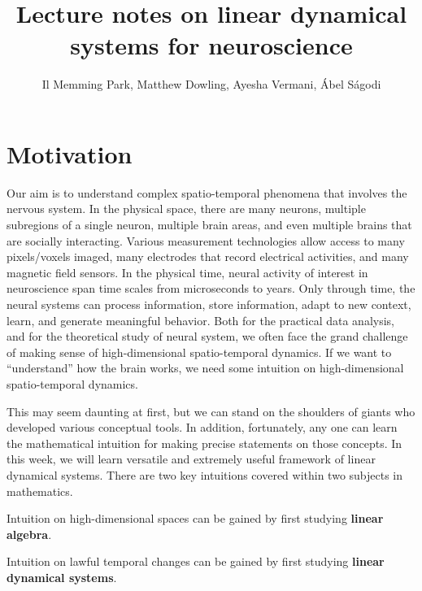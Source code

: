 \documentclass[a4paper,11pt]{exam}
\title{Lecture notes on linear dynamical systems for neuroscience}
\author{Il Memming Park, Matthew Dowling, Ayesha Vermani, \'Abel S\'agodi}
\newcounter{ct}
\begin{document}
\maketitle
\section{Motivation}
Our aim is to understand complex spatio-temporal phenomena that involves the nervous system.
In the physical space, there are many neurons, multiple subregions of a single neuron, multiple brain areas, and even multiple brains that are socially interacting.
Various measurement technologies allow access to many pixels/voxels imaged, many electrodes that record electrical activities, and many magnetic field sensors.
In the physical time, neural activity of interest in neuroscience span time scales from microseconds to years.
Only through time, the neural systems can process information, store information, adapt to new context, learn, and generate meaningful behavior.
Both for the practical data analysis, and for the theoretical study of neural system, we often face the grand challenge of making sense of high-dimensional spatio-temporal dynamics.
If we want to ``understand'' how the brain works, we need some intuition on high-dimensional spatio-temporal dynamics.

This may seem daunting at first, but we can stand on the shoulders of giants who developed various conceptual tools.
In addition, fortunately, any one can learn the mathematical intuition for making precise statements on those concepts.
In this week, we will learn versatile and extremely useful framework of linear dynamical systems.
There are two key intuitions covered within two subjects in mathematics.
\begin{tcolorbox}[colback=black!1!,title=Learning Objective 1]
    Intuition on high-dimensional spaces can be gained by first studying \textbf{linear algebra}.
\end{tcolorbox}
\begin{tcolorbox}[colback=black!1!,title=Learning Objective 2]
    Intuition on lawful temporal changes can be gained by first studying \textbf{linear dynamical systems}.
\end{tcolorbox}
\end{document}

